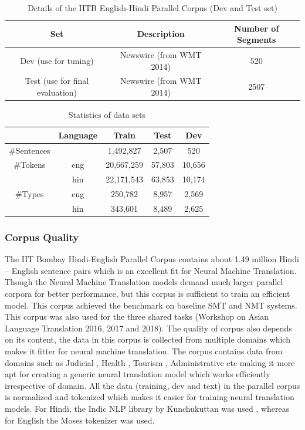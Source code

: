 \begin{table}[h!]
\centering
 \begin{tabular}{ |ccc| } 
  \hline \textbf{Set} & \textbf{Description} & \textbf{Number of Segments}  \\ 
  \hline
  Dev (use for tuning)& Newswire (from WMT 2014)&520\\
  Test (use for final evaluation)& Newswire (from WMT 2014) &2507\\
  \hline
 \end{tabular}
\caption{Details of the IITB English-Hindi Parallel Corpus (Dev and Test set)}
\end{table}

\begin{table}[h!]
\centering
 \begin{tabular}{ |ccccc| } 
  \hline &\textbf{Language} & \textbf{Train} & \textbf{Test} & \textbf{Dev} \\ 
  \hline 
  \#Sentences && 1,492,827&2,507& 520\\
  \hline
  \#Tokens& eng&20,667,259 &57,803& 10,656\\
  &hin& 22,171,543&63,853&10,174\\
  \hline
  \#Types&eng&250,782&8,957& 2,569\\
  &hin& 343,601&8,489& 2,625\\
  \hline
 \end{tabular}
\caption{Statistics of data sets}
\end{table}

\subsubsection{Corpus Quality}
The IIT Bombay Hindi-English Parallel Corpus contains about 1.49 million Hindi – English sentence pairs which is an excellent fit for Neural Machine Translation. Though the Neural Machine Translation models demand much larger parallel corpora for better performance, but this corpus  is sufficient to train an efficient model. This corpus achieved the benchmark on baseline SMT and NMT systems. This corpus was also used for the three shared tasks (Workshop on Asian Language Translation 2016, 2017 and 2018). The quality of corpus also depends on its content, the data in this corpus is collected from multiple domains which makes it fitter for neural machine translation. The corpus contains data from domains such as Judicial , Health , Tourism , Administrative etc making it more apt for creating a generic neural translation model which works efficiently irrespective of domain.
All the data (training, dev and text) in the parallel corpus is normalized and tokenized which makes it easier for training neural translation models. For Hindi, the Indic NLP library by Kunchukuttan was used , whereas for English the Moses tokenizer was used.  




